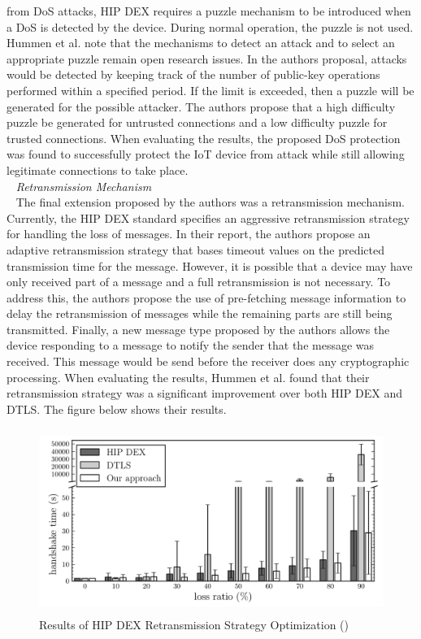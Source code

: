 \documentclass[letterpaper, 12pt]{article}
\begin{document}
\begin{flushleft}
from DoS attacks, HIP DEX requires a puzzle mechanism to be introduced when a DoS is detected by the device. During normal operation, the puzzle is not used.
Hummen et al. note that the mechanisms to detect an attack and to select an appropriate puzzle remain open research issues. In the authors proposal, attacks
would be detected by keeping track of the number of public-key operations performed within a specified period. If the limit is exceeded, then a puzzle will
be generated for the possible attacker. The authors propose that a high difficulty puzzle be generated for untrusted connections and a low difficulty puzzle
for trusted connections. When evaluating the results, the proposed DoS protection was found to successfully protect the IoT device from attack while still
allowing legitimate connections to take place. \\
~\newline
\textit{Retransmission Mechanism}\\ 
~\newline
The final extension proposed by the authors was a retransmission mechanism. Currently, the HIP DEX standard specifies an aggressive retransmission strategy
for handling the loss of messages. In their report, the authors propose an adaptive retransmission strategy that bases timeout values on the 
predicted transmission time for the message. However, it is possible that a device may have only received part of a message and a full retransmission
is not necessary. To address this, the authors propose the use of pre-fetching message information to delay the retransmission of messages while the 
remaining parts are still being transmitted. Finally, a new message type proposed by the authors allows the device responding to a message to notify the
sender that the message was received. This message would be send before the receiver does any cryptographic processing. When evaluating the results, 
Hummen et al. found that their retransmission strategy was a significant improvement over both HIP DEX and DTLS. The figure below shows their results.

\begin{figure}[H]
	\includegraphics[width=\linewidth,height=6cm,keepaspectratio]{figure7.png}
	\caption[Results of HIP DEX Retransmission Strategy Optimization]{Results of HIP DEX Retransmission Strategy Optimization (\cite{Hummen})}
	\label{fig:arch}
\end{figure}


\end{flushleft}
\end{document}
